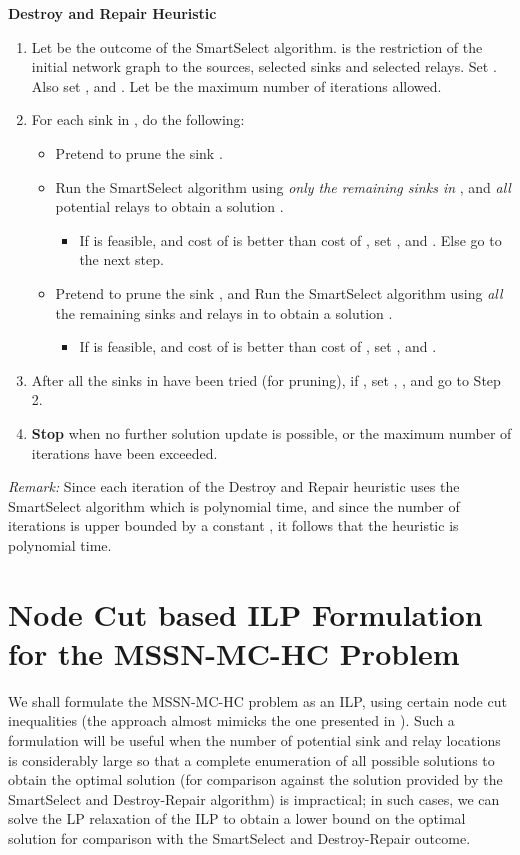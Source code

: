 \documentclass[conference]{IEEEtran}
\newcommand{\remark}[1]{{\emph{Remark:}} #1}
\newcommand{\gap}{\vspace{2mm}}
\begin{document}
\gap
\noindent
\textbf{Destroy and Repair Heuristic}
\begin{enumerate}
 \item Let  be the outcome of the SmartSelect algorithm.  is the restriction of the initial network graph  to the sources, selected sinks and selected relays. Set . Also set , and . Let  be the maximum number of iterations allowed.
 \item For each sink  in , do the following:
 \begin{itemize}
  \item Pretend to prune the sink .
  \item Run the SmartSelect algorithm using \emph{only the remaining sinks in }, and \emph{all} potential relays to obtain a solution .
  \begin{itemize}
  \item If  is feasible, and cost of  is better than cost of , set , and . Else go to the next step.
  \end{itemize}
  \item Pretend to prune the sink , and Run the SmartSelect algorithm using \emph{all} the remaining sinks and relays in  to obtain a solution .
  \begin{itemize}
   \item If  is feasible, and cost of  is better than cost of , set , and .
  \end{itemize}
 \end{itemize}
\item After all the sinks in  have been tried (for pruning), if , set , , and go to Step 2.
\item \textbf{Stop} when no further solution update is possible, or the maximum number of iterations have been exceeded. 
\end{enumerate}

\remark Since each iteration of the Destroy and Repair heuristic uses the SmartSelect algorithm which is polynomial time, and since the number of iterations is upper bounded by a constant , it follows that the heuristic is polynomial time. 

\section{Node Cut based ILP Formulation for the MSSN-MC-HC Problem}
\label{sec:ilp-oneconnect}
We shall formulate the MSSN-MC-HC problem as an ILP, using certain node cut inequalities (the approach almost mimicks the one presented in \cite{fullpaper}). Such a formulation will be useful when the number of potential sink and relay locations is considerably large so that a complete enumeration of all possible solutions to obtain the optimal solution (for comparison against the solution provided by the SmartSelect and Destroy-Repair algorithm) is impractical; in such cases, we can solve the LP relaxation of the ILP to obtain a lower bound on the optimal solution for comparison with the SmartSelect and Destroy-Repair outcome. 
\end{document}
